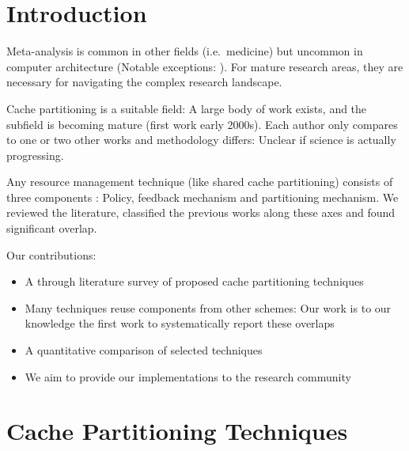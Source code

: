 \section{Introduction}


Meta-analysis is common in other fields (i.e.\ medicine) but uncommon in computer architecture (Notable exceptions: \cite{microlib,comparingPrevalingSimulationTechniques,desmet10}).
For mature research areas, they are necessary for navigating the complex research landscape.


Cache partitioning is a suitable field: A large body of work exists, and the subfield is becoming mature (first work early 2000s).
Each author only compares to one or two other works and methodology differs: Unclear if science is actually progressing.

Any resource management technique (like shared cache partitioning) consists of three components \cite{virtualPrivateMachines}: Policy, feedback mechanism and partitioning mechanism.
We reviewed the literature, classified the previous works along these axes and found significant overlap.


Our contributions:
\begin{itemize}
	\item A through literature survey of proposed cache partitioning techniques
	\item Many techniques reuse components from other schemes: Our work is to our knowledge the first work to systematically report these overlaps
	\item A quantitative comparison of selected techniques 
	\item We aim to provide our implementations to the research community
\end{itemize}

\section{Cache Partitioning Techniques}

